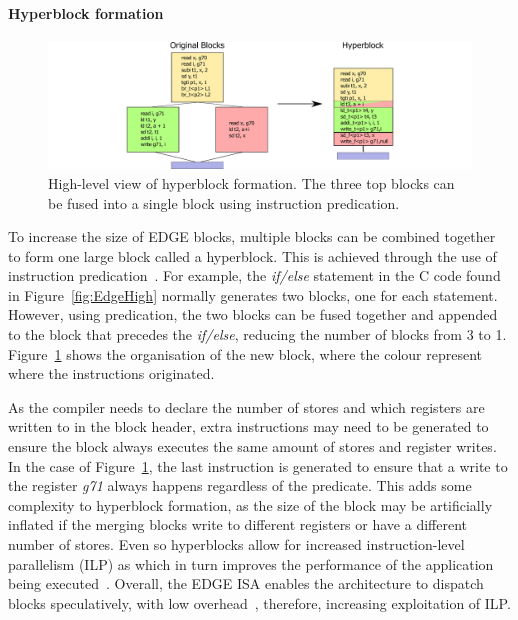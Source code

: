 \paragraph*{Hyperblock formation}
\begin{figure}[t]
    \centering
    \includegraphics[width=1\textwidth]{background/graphics/hyperblock.pdf}
    \caption{High-level view of hyperblock formation. The three top blocks can be fused into a single block using instruction predication.}
    \label{fig:EdgeHB}
	\vspace{-1em}
\end{figure}
To increase the size of EDGE blocks, multiple blocks can be combined together to form one large block called a hyperblock.
This is achieved through the use of instruction predication~\cite{smith2006edge}.
For example, the \textit{if/else} statement in the C code found in Figure~\ref{fig:EdgeHigh} normally generates two blocks, one for each statement.
However, using predication, the two blocks can be fused together and appended to the block that precedes the \textit{if/else}, reducing the number of blocks from 3 to 1.
Figure~\ref{fig:EdgeHB} shows the organisation of the new block, where the colour represent where the instructions originated.

As the compiler needs to declare the number of stores and which registers are written to in the block header, extra instructions may need to be generated to ensure the block always executes the same amount of stores and register writes.
In the case of Figure~\ref{fig:EdgeHB}, the last instruction is generated to ensure that a write to the register \textit{g71} always happens regardless of the predicate.
This adds some complexity to hyperblock formation, as the size of the block may be artificially inflated if the merging blocks write to different registers or have a different number of stores.
Even so hyperblocks allow for increased instruction-level parallelism (ILP) as  which in turn improves the performance of the application being executed~\cite{smith2006edge}.
Overall, the EDGE ISA enables the architecture to dispatch blocks speculatively, with low overhead~\cite{putnam2010e2,kim2007tflex}, therefore, increasing exploitation of ILP.


